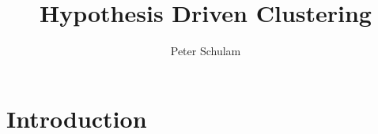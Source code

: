 \documentclass{article}
\title{Hypothesis Driven Clustering}
\author{Peter Schulam}
\date{}
\begin{document}
\maketitle

\section{Introduction}
\end{document}
